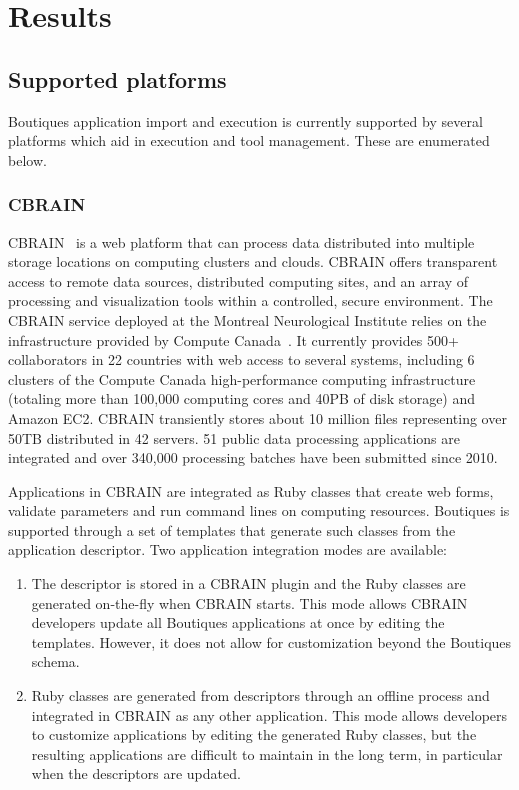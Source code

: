 \documentclass{article}
\newcommand{\boutiques}{Boutiques\xspace}
\begin{document}
\section{Results}
\label{sec:results}

\subsection{Supported platforms}

\boutiques application import and execution is currently supported by several
platforms which aid in execution and tool management. These are enumerated
below.

\subsubsection{CBRAIN}

CBRAIN~\cite{SHER-14} is a web platform that can process data
distributed into multiple storage locations on computing clusters and
clouds. CBRAIN offers transparent access to remote data sources,
distributed computing sites, and an array of processing and
visualization tools within a controlled, secure environment.  The
CBRAIN service deployed at the Montreal Neurological Institute relies
on the infrastructure provided by Compute Canada~\cite{das2016mni}. It
currently provides 500+ collaborators in 22 countries with web access
to several systems, including 6 clusters of the Compute Canada
high-performance computing infrastructure (totaling more than 100,000
computing cores and 40PB of disk storage) and Amazon EC2. CBRAIN
transiently stores about 10 million files representing over 50TB
distributed in 42 servers. 51 public data processing applications are
integrated and over 340,000 processing batches have been submitted since 2010.

Applications in CBRAIN are integrated as Ruby classes that create web
forms, validate parameters and run command lines on computing
resources. \boutiques is supported through a set of templates that
generate such classes from the application descriptor. Two application
integration modes are available:
\begin{enumerate}
  \item The descriptor is stored in a CBRAIN plugin and the Ruby classes
    are generated on-the-fly when CBRAIN starts. This mode allows
    CBRAIN developers update all \boutiques applications at once by
    editing the templates. However, it does not allow for
    customization beyond the \boutiques schema.
  \item Ruby classes are generated from descriptors
    through an offline process and integrated in CBRAIN as any other
    application. This mode allows developers to customize applications
    by editing the generated Ruby classes, but the resulting
    applications are difficult to maintain in the long term, in
    particular when the descriptors are updated.
\end{enumerate}
\end{document}
